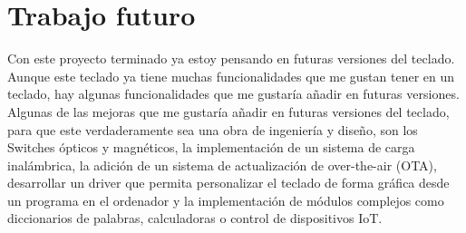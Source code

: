 \section{Trabajo futuro}
Con este proyecto terminado ya estoy pensando en futuras versiones del teclado. Aunque este teclado ya tiene muchas funcionalidades que me gustan tener en un teclado, hay algunas funcionalidades que me gustaría añadir en futuras versiones. Algunas de las mejoras que me gustaría añadir en futuras versiones del teclado, para que este verdaderamente sea una obra de ingeniería y diseño, son los \gls{Switches} ópticos y magnéticos, la implementación de un sistema de carga inalámbrica, la adición de un sistema de actualización de  over-the-air (OTA), desarrollar un driver que permita personalizar el teclado de forma gráfica desde un programa en el ordenador y la implementación de módulos complejos como diccionarios de palabras, calculadoras o control de dispositivos \gls{IoT}.